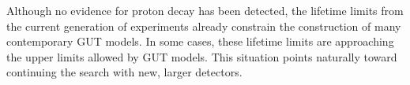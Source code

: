 Although no evidence for proton decay has been detected, the lifetime
limits from the current generation of experiments already constrain
the construction of many contemporary GUT %
models. In some cases, these lifetime limits are approaching the upper limits
allowed
by GUT models.
This situation points naturally toward continuing the search with new, larger
detectors.
